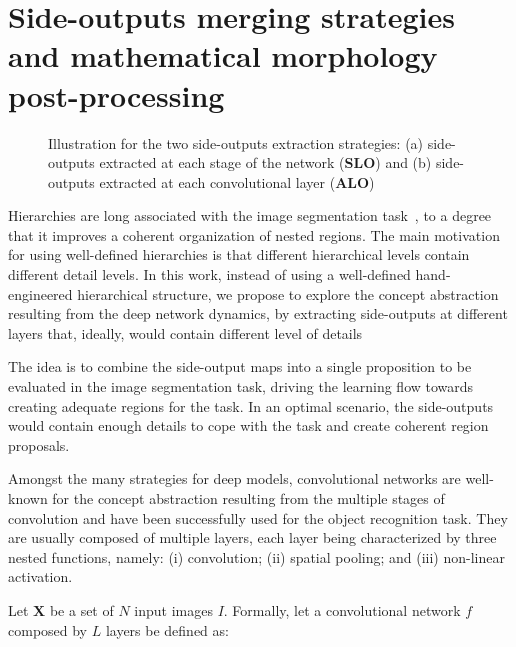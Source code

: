\section{Side-outputs merging strategies and mathematical morphology post-processing}
\label{sec:method}


\begin{figure}[!t]
\centering
{}
\hfil
{}
\caption{Illustration for the two side-outputs extraction strategies:  (a) side-outputs extracted at each stage of the network (\textbf{SLO}) and (b) side-outputs extracted at each convolutional layer (\textbf{ALO})}
\label{fig:extraction}
\end{figure}

Hierarchies are long associated with the image segmentation task~\cite{jones97,cardelino06,najman12,xu16,cousty18}, to a degree that it improves a coherent organization of nested regions. The main motivation for using well-defined hierarchies is that different hierarchical levels contain different detail levels. In this work, instead of using a well-defined hand-engineered hierarchical structure, we propose to explore the concept abstraction resulting from the deep network dynamics, by extracting side-outputs at different layers that, ideally, would contain different level of details


The idea is to combine the side-output maps into a single proposition to be evaluated in the image segmentation task, driving the learning flow towards creating adequate regions for the task. In an optimal scenario, the side-outputs would contain enough details to cope with the task and create coherent region proposals. 

Amongst the many strategies for deep models, convolutional networks are well-known for the concept abstraction resulting from the multiple stages of convolution and have been successfully used for the object recognition task. They are usually composed of multiple layers, each layer being characterized by three nested functions, namely: (i) convolution; (ii) spatial pooling; and (iii) non-linear activation. 

Let $\mathbf{X}$ be a set of $N$ input images $I$. Formally, let a convolutional network $\mathit{f}$ composed by $L$ layers be defined as:

